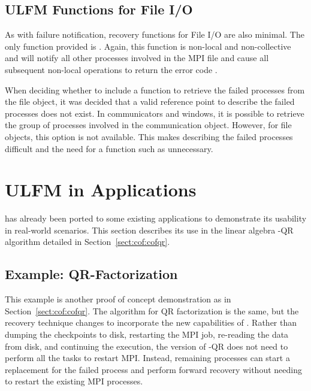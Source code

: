 \subsection{ULFM Functions for File I/O}
\label{subsec:ulfm:beyond:io}

As with failure notification, recovery functions for File I/O are also minimal.
The only function provided is . Again, this function
is non-local and non-collective and will notify all other processes involved
in the MPI file and cause all subsequent non-local operations to return the
error code .

When deciding whether to include a function to retrieve the failed processes 
from the file object, it was decided that a valid reference point to describe 
the failed processes does not exist. In communicators and windows, it is 
possible to retrieve the group of processes involved in the communication 
object. However, for file objects, this option is not available. This makes 
describing the failed processes difficult and the need for a function such as 
 unnecessary.


\section{ULFM in Applications}
\label{sec:ulfm:apps}

\ulfm has already been ported to some existing applications to demonstrate its 
usability in real-world scenarios. This section describes its use in the 
linear algebra \abft-QR algorithm detailed in Section~\ref{sect:cof:cofqr}.

\subsection{Example: QR-Factorization}
\label{subsec:ulfm:apps:qr}

This example is another proof of concept demonstration as in 
Section~\ref{sect:cof:cofqr}. The \abft algorithm for QR factorization is the 
same, but the recovery technique changes to incorporate the new capabilities of 
\ulfm. Rather than dumping the checkpoints to disk, restarting the MPI job, 
re-reading the data from disk, and continuing the execution, the \ulfm version of 
\abft-QR does not need to perform all the tasks to restart MPI. Instead, remaining 
processes can start a replacement for the failed process and perform forward 
recovery without needing to restart the existing MPI processes.


